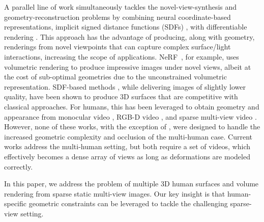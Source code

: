A parallel line of work simultaneously tackles the novel-view-synthesis and geometry-reconstruction problems by combining neural coordinate-based representations, \eg implicit signed distance functions (SDFs) \cite{park2019deepsdf}, with differentiable rendering \cite{yariv2021volume,wang2021neus,yariv2020multiview,mildenhall2020nerf}. 
This approach has the advantage of producing, along with geometry, renderings from novel viewpoints that can capture complex surface/light interactions, increasing the scope of applications. 
NeRF~\cite{mildenhall2020nerf}, for example, uses volumetric rendering to produce impressive images under novel views, albeit at the cost of sub-optimal geometries due to the unconstrained volumetric representation. 
SDF-based methods \cite{yariv2021volume,wang2021neus,yariv2020multiview}, while delivering images of slightly lower quality, have been shown to produce 3D surfaces that are competitive with classical approaches. 
For humans, this has been leveraged to obtain geometry and appearance from monocular video \cite{jiang2022selfrecon,chen2021animatable}, RGB-D video \cite{dong2022pina}, and sparse multi-view video \cite{wang2022arah, liu2021neural, peng2021neural, zheng2021deepmulticap, kwon2021neural, peng2021animatable, xu2021h, weng2022humannerf}. 
However, none of these works, with the exception of \cite{zheng2021deepmulticap,zhang2021editable}, were designed to handle the increased geometric complexity and occlusion of the multi-human case. 
Current works \cite{zheng2021deepmulticap,zhang2021editable} address the multi-human setting, but both require a set of videos, which effectively becomes a dense array of views as long as deformations are modeled correctly.

In this paper, we address the problem of multiple 3D human surfaces and volume rendering from sparse static multi-view images. Our key insight is that human-specific geometric constraints can be leveraged to tackle the challenging sparse-view setting.

